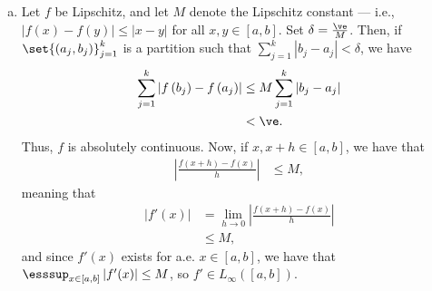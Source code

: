 \documentclass[10pt]{mypackage}
\begin{document}
\begin{enumerate}[(a)]
  \item Let $f$ be Lipschitz, and let $M$ denote the Lipschitz constant --- i.e., $\left\vert f(x)-f(y) \right\vert\leq \left\vert x-y \right\vert$ for all $x,y\in [a,b]$. Set $\delta = \frac{\ve}{M}$. Then, if $\set{\left( a_j,b_j \right)}_{j=1}^{k}$ is a partition such that $\sum_{j=1}^{k}\left\vert b_j-a_j \right\vert < \delta$, we have
    \begin{align*}
      \sum_{j=1}^{k} \left\vert f\left(b_j\right)-f\left( a_j \right) \right\vert &\leq M\sum_{j=1}^{k} \left\vert b_j-a_j \right\vert\\
                                                                                  &< \ve.
    \end{align*}
    Thus, $f$ is absolutely continuous. Now, if $x,x+h\in [a,b]$, we have that
    \begin{align*}
      \left\vert \frac{f\left( x+h \right)-f\left( x \right)}{h} \right\vert &\leq M,
    \end{align*}
    meaning that
    \begin{align*}
      \left\vert f'(x) \right\vert &= \lim_{h\rightarrow 0} \left\vert \frac{f\left( x+h \right)-f(x)}{h} \right\vert\\
                                   &\leq M,
    \end{align*}
    and since $f'(x)$ exists for a.e. $x\in [a,b]$, we have that $\esssup_{x\in [a,b]} \left\vert f'(x) \right\vert \leq M$, so $f'\in L_{\infty}\left( [a,b] \right)$.\newline


\end{enumerate}
\end{document}
